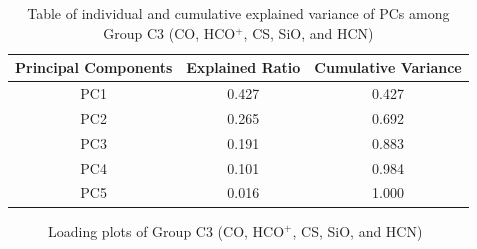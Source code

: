 \documentclass{aa}
\begin{document}
\begin{CJK*}{UTF8}{gbsn}

\begin{table}[htbp]
\centering
\begin{tabular}{ccc}
\hline\hline
\multicolumn{1}{l}{Principal Components} & \multicolumn{1}{l}{Explained Ratio} & Cumulative Variance \\ \hline
        PC1 & 0.427  & 0.427\\ 
        PC2 & 0.265  & 0.692\\
        PC3 & 0.191  & 0.883\\
        PC4 & 0.101  & 0.984\\ 
        PC5 & 0.016  & 1.000\\ \hline\hline
\end{tabular}
\caption{Table of individual and cumulative explained variance of PCs among Group C3 (CO, HCO$^+$, CS, SiO, and HCN)}
\label{table-5-variance}
\end{table}


   \begin{figure}[htbp]
\centering  
{}
\caption{Loading plots of Group C3 (CO, HCO$^+$, CS, SiO, and HCN)}
\label{Fig-5-loading}
\end{figure}
   

\end{CJK*}
\end{document}
